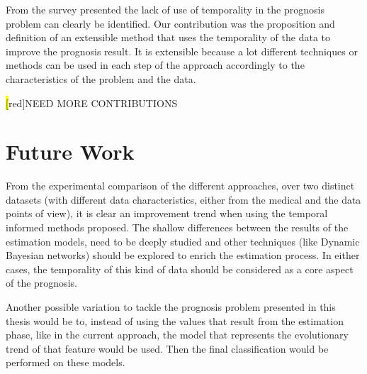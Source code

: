 From the survey presented the lack of use of temporality in the prognosis problem can clearly be identified. 
Our contribution was the proposition and definition of an extensible method that uses the temporality of the data to improve the prognosis result. It is extensible because a lot different techniques or methods can be used in each step of the approach accordingly to the characteristics of the problem and the data.

\hl[red]{NEED MORE CONTRIBUTIONS}


\section{Future Work}
\label{section:future}

From the experimental comparison of the different approaches, over two distinct datasets (with different data characteristics,
 either from the medical and the data points of view), it is clear an improvement trend when using the temporal informed
 methods proposed. The shallow differences between the results of the estimation models, need to be deeply studied and other
 techniques (like Dynamic Bayesian networks) should be explored to enrich the estimation process. In either cases,
 the temporality of this kind of data should be considered as a core aspect of the prognosis.
 
Another possible variation to tackle the prognosis problem presented in this thesis would be to, instead of using the 
values that result from the estimation phase, like in the current approach, the model that represents the evolutionary trend of that
 feature would be used. Then the final classification would be performed on these models.

\cleardoublepage


